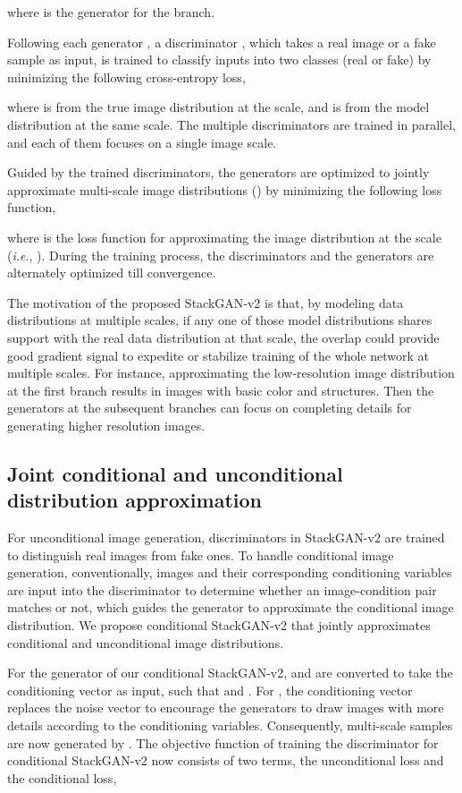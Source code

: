 \documentclass[10pt,journal,letterpaper,compsoc]{IEEEtran}
\begin{document}
where  is the generator for the  branch. 


Following each generator , a discriminator , which takes a real image  or a fake sample  as input, is trained to classify inputs into two classes (real or fake) by minimizing the following cross-entropy loss,

where  is from the true image distribution  at the  scale, and  is from the model distribution  at the same scale. The multiple discriminators are trained in parallel, and each of them focuses on a single image scale. 


Guided by the trained discriminators, the generators are optimized to jointly approximate multi-scale image distributions () by minimizing the following loss function,

where  is the loss function for approximating the image distribution at the  scale (\emph{i.e}., ). During the training process, the discriminators  and the generators  are alternately optimized till convergence.  

The motivation of the proposed StackGAN-v2 is that, by modeling data distributions at multiple scales, if any one of those model distributions shares support with the real data distribution at that scale, the overlap could provide good gradient signal to expedite or stabilize training of the whole network at multiple scales. For instance, approximating the low-resolution image distribution at the first branch results in images with basic color and structures. Then the generators at the subsequent branches can focus on completing details for generating higher resolution images. 


\subsection{Joint conditional and unconditional distribution approximation}

For unconditional image generation, discriminators in StackGAN-v2 are trained to distinguish real images from fake ones. To handle conditional image generation, conventionally, images and their corresponding conditioning variables are input into the discriminator to determine whether an image-condition pair matches or not, which guides the generator to approximate the conditional image distribution. We propose conditional StackGAN-v2 that jointly approximates conditional and unconditional image distributions. 


For the generator of our conditional StackGAN-v2,  and  are converted to take the conditioning vector  as input, such that  and . For , the conditioning vector  replaces the noise vector  to encourage the generators to draw images with more details according to the conditioning variables. Consequently, multi-scale samples are now generated by . The objective function of training the discriminator  for conditional StackGAN-v2 now consists of two terms, the unconditional loss and the conditional loss, 
\end{document}
